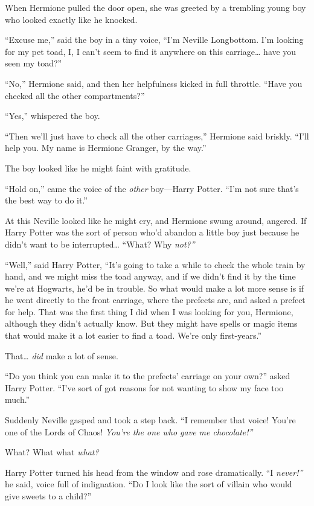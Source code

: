 When Hermione pulled the door open, she was greeted by a trembling young
boy who looked exactly like he knocked.

``Excuse me,'' said the boy in a tiny voice, ``I'm Neville Longbottom.
I'm looking for my pet toad, I, I can't seem to find it anywhere on this
carriage\ldots{} have you seen my toad?''

``No,'' Hermione said, and then her helpfulness kicked in full throttle.
``Have you checked all the other compartments?''

``Yes,'' whispered the boy.

``Then we'll just have to check all the other carriages,'' Hermione said
briskly. ``I'll help you. My name is Hermione Granger, by the way.''

The boy looked like he might faint with gratitude.

``Hold on,'' came the voice of the \emph{other} boy---Harry Potter.
``I'm not sure that's the best way to do it.''

At this Neville looked like he might cry, and Hermione swung around,
angered. If Harry Potter was the sort of person who'd abandon a little
boy just because he didn't want to be interrupted\ldots{} ``What? Why
\emph{not?''}

``Well,'' said Harry Potter, ``It's going to take a while to check the
whole train by hand, and we might miss the toad anyway, and if we didn't
find it by the time we're at Hogwarts, he'd be in trouble. So what would
make a lot more sense is if he went directly to the front carriage,
where the prefects are, and asked a prefect for help. That was the first
thing I did when I was looking for you, Hermione, although they didn't
actually know. But they might have spells or magic items that would make
it a lot easier to find a toad. We're only first-years.''

That\ldots{} \emph{did} make a lot of sense.

``Do you think you can make it to the prefects' carriage on your own?''
asked Harry Potter. ``I've sort of got reasons for not wanting to show
my face too much.''

Suddenly Neville gasped and took a step back. ``I remember that voice!
You're one of the Lords of Chaos! \emph{You're the one who gave me
chocolate!''}

What? What what \emph{what?}

Harry Potter turned his head from the window and rose dramatically. ``I
\emph{never!''} he said, voice full of indignation. ``Do I look like the
sort of villain who would give sweets to a child?''

